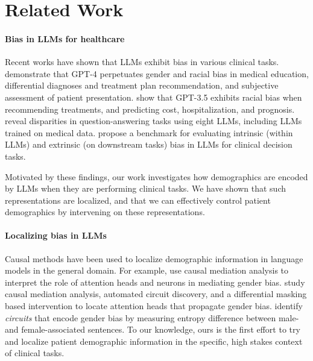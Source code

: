 \section{Related Work}
\label{section:related-work}

\paragraph{Bias in LLMs for healthcare}
Recent works have shown that LLMs exhibit bias in various clinical tasks. 
\citet{zack2024assessing} demonstrate that GPT-4 perpetuates gender and racial bias in medical education, differential diagnoses and treatment plan recommendation, and subjective assessment of patient presentation. 
\citet{Yang_2024} show that GPT-3.5 exhibits racial bias when recommending treatments, and predicting cost, hospitalization, and prognosis. \citet{poulain2024biaspatternsapplicationllms} reveal disparities in question-answering tasks using eight LLMs, including LLMs trained on medical data. 
\citet{zhang2024climb} propose a benchmark for evaluating intrinsic (within LLMs) and extrinsic (on downstream tasks) bias in LLMs for clinical decision tasks. 

Motivated by these findings, our work investigates how demographics are encoded by LLMs when they are performing clinical tasks. 
We have shown that such representations are localized, and that we can effectively control patient demographics by intervening on these representations. 

\paragraph{Localizing bias in LLMs}Causal methods have been used to localize demographic information in language models in the general domain. 
For example, \citet{vig2020causal} use causal mediation analysis to interpret the role of attention heads and neurons in mediating gender bias. 
\citet{chintam2023identifying} study causal mediation analysis,
automated circuit discovery, and a differential
masking based intervention to locate attention heads that propagate gender bias. \citet{yu2025understanding} identify \emph{circuits} that encode gender bias by measuring entropy difference between  male- and female-associated sentences. 
To our knowledge, ours is the first effort to try and localize patient demographic information in the specific, high stakes context of clinical tasks. 
